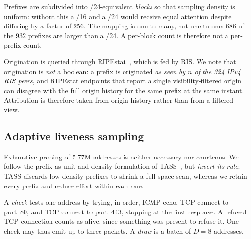 Prefixes are subdivided into /24-equivalent \emph{blocks} so that sampling density is
uniform: without this a /16 and a /24 would receive equal attention despite differing by a
factor of 256. The mapping is one-to-many, not one-to-one: 686 of the 932 prefixes are
larger than a /24. A per-block count is therefore not a per-prefix count.

Origination is queried through RIPEstat~\cite{ripestat}, which is fed by RIS. We note that
origination is \emph{not} a boolean: a prefix is originated \emph{as seen by $n$ of the
324 IPv4 RIS peers}, and RIPEstat endpoints that report a single visibility-filtered
origin can disagree with the full origin history for the same prefix at the same instant.
Attribution is therefore taken from origin history rather than from a filtered view.

\subsection{Adaptive liveness sampling}
\label{sec:sampling}

Exhaustive probing of 5.77M addresses is neither necessary nor courteous. We follow the
prefix-as-unit and density formulation of TASS~\cite{klick2016}, but \emph{invert its
rule}: TASS discards low-density prefixes to shrink a full-space scan, whereas we retain
every prefix and reduce effort within each one.

A \emph{check} tests one address by trying, in order, ICMP echo, TCP connect to port~80,
and TCP connect to port~443, stopping at the first response. A refused TCP connection
counts as alive, since something was present to refuse it. One check may thus emit up to
three packets. A \emph{draw} is a batch of $D=8$ addresses.

